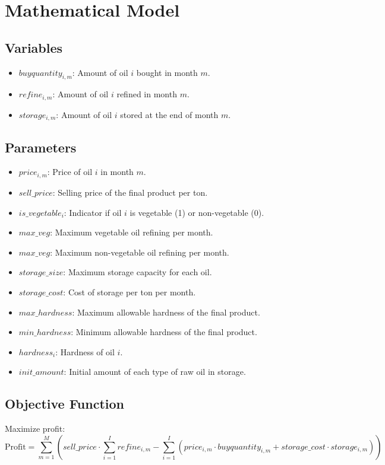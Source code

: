 \documentclass{article}
\begin{document}
\section*{Mathematical Model}

\subsection*{Variables}
\begin{itemize}
    \item \( buyquantity_{i,m} \): Amount of oil \( i \) bought in month \( m \).
    \item \( refine_{i,m} \): Amount of oil \( i \) refined in month \( m \).
    \item \( storage_{i,m} \): Amount of oil \( i \) stored at the end of month \( m \).
\end{itemize}

\subsection*{Parameters}
\begin{itemize}
    \item \( price_{i,m} \): Price of oil \( i \) in month \( m \).
    \item \( sell\_price \): Selling price of the final product per ton.
    \item \( is\_vegetable_{i} \): Indicator if oil \( i \) is vegetable (1) or non-vegetable (0).
    \item \( max\_veg \): Maximum vegetable oil refining per month.
    \item \( max\_veg \): Maximum non-vegetable oil refining per month.
    \item \( storage\_size \): Maximum storage capacity for each oil.
    \item \( storage\_cost \): Cost of storage per ton per month.
    \item \( max\_hardness \): Maximum allowable hardness of the final product.
    \item \( min\_hardness \): Minimum allowable hardness of the final product.
    \item \( hardness_{i} \): Hardness of oil \( i \).
    \item \( init\_amount \): Initial amount of each type of raw oil in storage.
\end{itemize}

\subsection*{Objective Function}
Maximize profit:
\[
\text{Profit} = \sum_{m=1}^{M} \left( sell\_price \cdot \sum_{i=1}^{I} refine_{i,m} - \sum_{i=1}^{I} (price_{i,m} \cdot buyquantity_{i,m} + storage\_cost \cdot storage_{i,m}) \right)
\]
\end{document}
